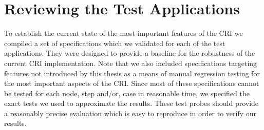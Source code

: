 \section{Reviewing the Test Applications}
\label{sec:EvalTests}
To establish the current state of the most important features of the CRI we compiled a set of specifications which we validated for each of the test applications. They were designed to provide a baseline for the robustness of the current CRI implementation. Note that we also included specifications targeting features not introduced by this thesis as a means of manual regression testing for the most important aspects of the CRI. Since most of these specifications cannot be tested for each node, step and/or, case in reasonable time, we specified the exact tests we used to approximate the results. These test probes should provide a reasonably precise evaluation which is easy to reproduce in order to verify our results.

